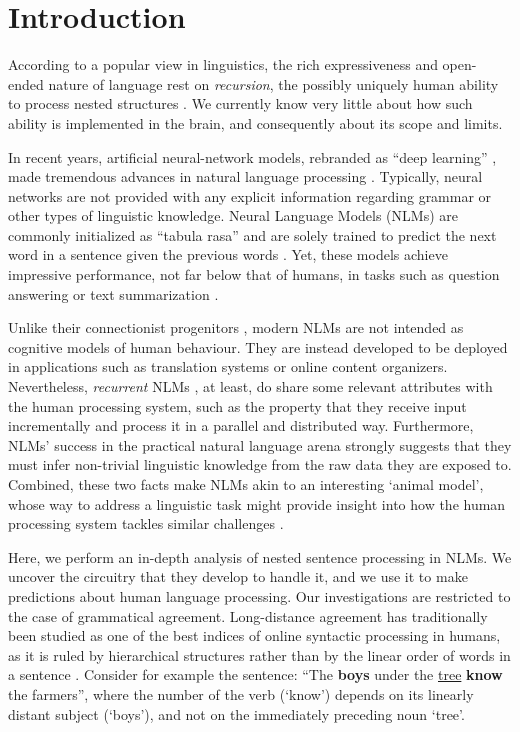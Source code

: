 \section{Introduction}

According to a popular view in linguistics, the rich expressiveness and open-ended nature of language rest on \emph{recursion}, the possibly uniquely human ability to process nested structures \citep{Chomsky:1957, Hauser:etal:2002, Dehaene:etal:2015}. 
We currently know very little about how such ability is implemented in the brain, and consequently about its scope and limits.

In recent years, artificial neural-network models, rebranded as ``deep learning'' \citep{LeCun:etal:2015}, made tremendous advances in natural language processing \citep{Goldberg:2017}. Typically, neural networks are not provided with any explicit information regarding grammar or other types of linguistic knowledge. Neural Language Models (NLMs) are commonly initialized as ``tabula rasa'' and are solely trained to predict the next word in a sentence given the previous words \citep{Mikolov:2012}. Yet, these models achieve impressive performance, not far below that of humans, in tasks such as question answering or text summarization \citep{Radford:etal:2019}. 

Unlike their connectionist progenitors \citep{Rumelhart:etal:1986,Rumelhart:etal:1986b}, modern NLMs are not intended as cognitive models of human behaviour. 
They are instead developed to be deployed in applications such as translation systems or online content organizers. 
Nevertheless, \emph{recurrent} NLMs  \citep{Elman:1990,Hochreiter:Schmidhuber:1997}, at least, do share some relevant attributes with the human processing system, such as the property that they receive input incrementally  and process it in a parallel and distributed way. Furthermore, NLMs' success in the practical natural language arena strongly suggests that they must infer non-trivial linguistic knowledge from the raw data they are exposed to. Combined, these two facts make NLMs akin to an interesting `animal model', whose way to address a linguistic task might provide insight into how the human processing system tackles similar challenges \citep[see also][]{McCloskey:1991}.

Here, we perform an in-depth analysis of nested sentence processing in NLMs. We uncover the circuitry that they develop to handle it, and we use it to make predictions about human language processing. Our investigations are restricted to the case of grammatical agreement. Long-distance agreement has traditionally been studied as one of the  best indices of online syntactic processing in humans, as it is ruled
by hierarchical structures rather than by the linear order of words in
a sentence \citep{Bock:Miller:1991, franck2002subject}. Consider for example the sentence: ``The \textbf{boys} under the \underline{tree} \textbf{know} the farmers'', where the number of the verb (`know') depends on its linearly distant subject (`boys'), and not on the immediately preceding noun `tree'.

